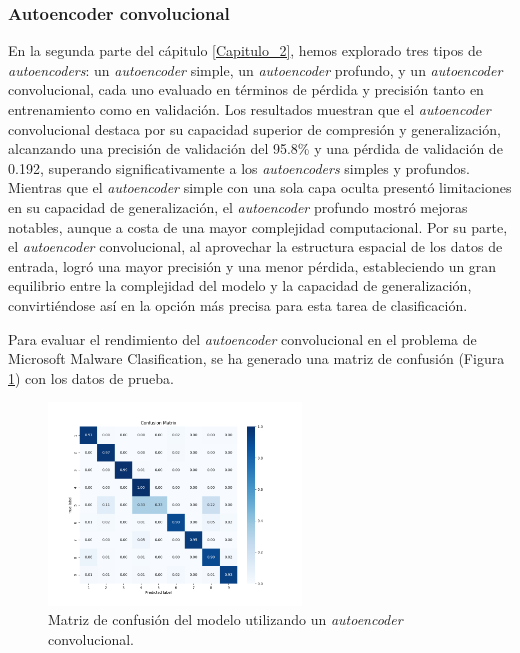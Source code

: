 \subsubsection*{Autoencoder convolucional}
En la segunda parte del cápitulo \ref{Capitulo_2}, hemos explorado tres tipos de \textit{autoencoders}: un \textit{autoencoder} simple, un \textit{autoencoder} profundo, y un \textit{autoencoder} convolucional, cada uno evaluado en términos de pérdida y precisión tanto en entrenamiento como en validación. Los resultados muestran que el \textit{autoencoder} convolucional destaca por su capacidad superior de compresión y generalización, alcanzando una precisión de validación del 95.8\% y una pérdida de validación de 0.192, superando significativamente a los \textit{autoencoders} simples y profundos. Mientras que el \textit{autoencoder} simple con una sola capa oculta presentó limitaciones en su capacidad de generalización, el \textit{autoencoder} profundo mostró mejoras notables, aunque a costa de una mayor complejidad computacional. Por su parte, el \textit{autoencoder} convolucional, al aprovechar la estructura espacial de los datos de entrada, logró una mayor precisión y una menor pérdida, estableciendo un gran equilibrio entre la complejidad del modelo y la capacidad de generalización, convirtiéndose así en la opción más precisa para esta tarea de clasificación.


Para evaluar el rendimiento del \textit{autoencoder} convolucional en el problema de Microsoft Malware Clasification, se ha generado una matriz de confusión (Figura \ref{fig: caeConfusionMatrix}) con los datos de prueba. 


\begin{figure}[H]
    \centering
    \includegraphics[width=0.6\textwidth]{img/confusionMatrixCAENorm1.png}
    \caption{Matriz de confusión del modelo utilizando un \textit{autoencoder} convolucional.}
    \label{fig: caeConfusionMatrix}
\end{figure}


